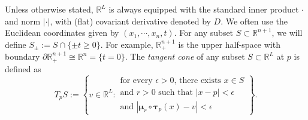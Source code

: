 \documentclass[10pt]{amsart}
\theoremstyle{definition}
\theoremstyle{remark}
\numberwithin{equation}{section}
\newcommand{\ep}{\epsilon}
\newcommand{\bmu}{\boldsymbol \mu}
\newcommand{\btau}{\boldsymbol \tau}
\begin{document}
Unless otherwise stated, $\mathbb{R}^L$ is always equipped with the standard inner product $\cdot$ and norm $| \cdot |$, with (flat) covariant derivative denoted by $D$. We often use the Euclidean coordinates given by $(x_1,\cdots,x_n,t)$. For any subset $S \subset \mathbb{R}^{n+1}$, we will define
$ S_\pm := S \cap \{ \pm t \geq 0\}$. For example, $\mathbb{R}^{n+1}_+$ is the upper half-space with boundary $\partial \mathbb{R}^{n+1}_+ \cong \mathbb{R}^n=\{t=0\}$. The \emph{tangent cone} of any subset $S \subset \mathbb{R}^L$ at $p$ is defined as 
\begin{equation}
\label{E:tangent-cone-def}
T_pS:=\left\{v \in \mathbb{R}^L : \begin{array}{l}
\text{for every $\ep>0$, there exists $x \in S$} \\
\text{and $r >0$ such that $|x-p| < \ep$} \\
\text{and $|\bmu_r \circ \btau_p (x)-v|< \ep$}
\end{array} \right\}.
\end{equation}
\end{document}
